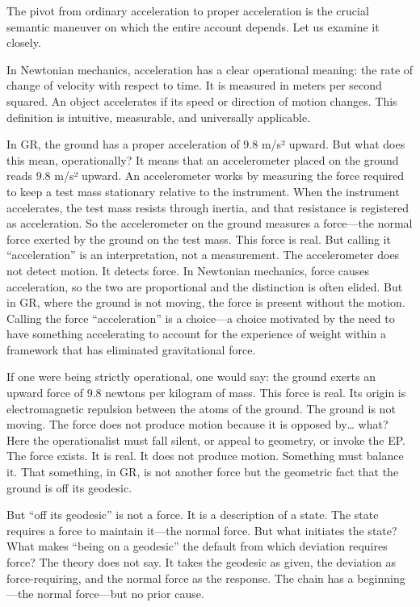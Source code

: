 \documentclass[11pt]{article}
\begin{document}
The pivot from ordinary acceleration to proper acceleration is the crucial semantic maneuver on which the entire account depends. Let us examine it closely.

In Newtonian mechanics, acceleration has a clear operational meaning: the rate of change of velocity with respect to time. It is measured in meters per second squared. An object accelerates if its speed or direction of motion changes. This definition is intuitive, measurable, and universally applicable.

In GR, the ground has a proper acceleration of 9.8 m/s² upward. But what does this mean, operationally? It means that an accelerometer placed on the ground reads 9.8 m/s² upward. An accelerometer works by measuring the force required to keep a test mass stationary relative to the instrument. When the instrument accelerates, the test mass resists through inertia, and that resistance is registered as acceleration. So the accelerometer on the ground measures a force---the normal force exerted by the ground on the test mass. This force is real. But calling it ``acceleration'' is an interpretation, not a measurement. The accelerometer does not detect motion. It detects force. In Newtonian mechanics, force causes acceleration, so the two are proportional and the distinction is often elided. But in GR, where the ground is not moving, the force is present without the motion. Calling the force ``acceleration'' is a choice---a choice motivated by the need to have something accelerating to account for the experience of weight within a framework that has eliminated gravitational force.

If one were being strictly operational, one would say: the ground exerts an upward force of 9.8 newtons per kilogram of mass. This force is real. Its origin is electromagnetic repulsion between the atoms of the ground. The ground is not moving. The force does not produce motion because it is opposed by\ldots{} what? Here the operationalist must fall silent, or appeal to geometry, or invoke the EP. The force exists. It is real. It does not produce motion. Something must balance it. That something, in GR, is not another force but the geometric fact that the ground is off its geodesic.

But ``off its geodesic'' is not a force. It is a description of a state. The state requires a force to maintain it---the normal force. But what initiates the state? What makes ``being on a geodesic'' the default from which deviation requires force? The theory does not say. It takes the geodesic as given, the deviation as force-requiring, and the normal force as the response. The chain has a beginning---the normal force---but no prior cause.
\end{document}
